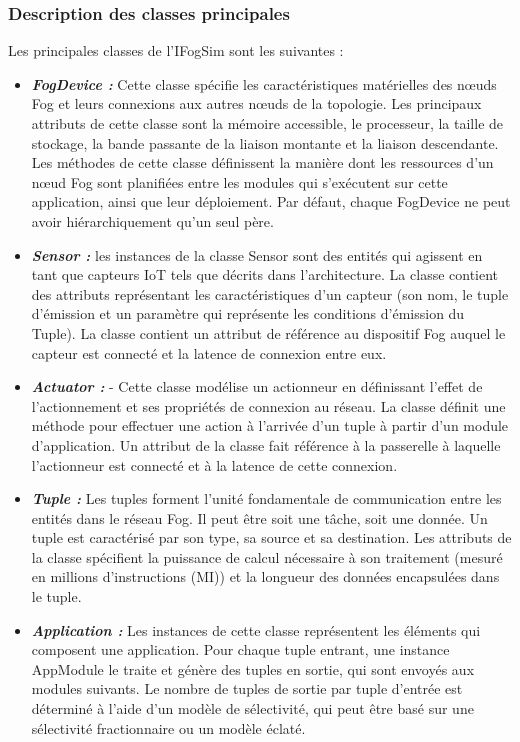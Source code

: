 \subsubsection{Description des classes principales}
Les principales classes de l'IFogSim sont les suivantes :
\begin{itemize}
    \item \textbf{\emph{FogDevice :}} Cette classe spécifie les caractéristiques matérielles des nœuds Fog et leurs connexions aux autres nœuds de la topologie. Les principaux attributs de cette classe sont la mémoire accessible, le processeur, la taille de stockage, la bande passante de la liaison montante et la liaison descendante. Les méthodes de cette classe définissent la manière dont les ressources d'un nœud Fog sont planifiées entre les modules qui s'exécutent sur cette application, ainsi que leur déploiement. Par défaut, chaque FogDevice ne peut avoir hiérarchiquement qu'un seul père.
    \item \textbf{\emph{Sensor :}}  les instances de la classe Sensor sont des entités qui agissent en tant que capteurs IoT tels que décrits dans l'architecture. La classe contient des attributs représentant les caractéristiques d'un capteur (son nom, le tuple d'émission et un paramètre qui représente les conditions d'émission du Tuple). La classe contient un attribut de référence au dispositif Fog auquel le capteur est connecté et la latence de connexion entre eux. 
    \item \textbf{\emph{Actuator  :}} -  Cette classe modélise un actionneur en définissant l'effet de l'actionnement et ses propriétés de connexion au réseau. La classe définit une méthode pour effectuer une action à l'arrivée d'un tuple à partir d'un module d'application. Un attribut de la classe fait référence à la passerelle à laquelle l'actionneur est connecté et à la latence de cette connexion.
    \item \textbf{\emph{Tuple :}} Les tuples forment l'unité fondamentale de communication entre les entités dans le réseau Fog. Il peut être soit une tâche, soit une donnée. Un tuple est caractérisé par son type, sa source et sa destination. Les attributs de la classe spécifient la puissance de calcul nécessaire à son traitement (mesuré en millions d'instructions (MI)) et la longueur des données encapsulées dans le tuple.
    \item \textbf{\emph{Application :}} Les instances de cette classe représentent les éléments qui composent une application. Pour chaque tuple entrant, une instance AppModule le traite et génère des tuples en sortie, qui sont envoyés aux modules suivants. Le nombre de tuples de sortie par tuple d'entrée est déterminé à l'aide d'un modèle de sélectivité, qui peut être basé sur une sélectivité fractionnaire ou un modèle éclaté.

\end{itemize}
